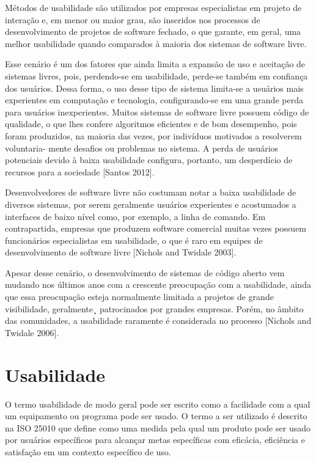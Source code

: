 \documentclass[12pt]{article}
\begin{document}
Métodos de usabilidade são utilizados por empresas especialistas em projeto de interação e, em menor ou maior grau, são inseridos nos processos de desenvolvimento de projetos de software fechado, o que garante, em geral, uma melhor usabilidade quando comparados à maioria dos sistemas de software livre.
%

Esse cenário é um dos fatores que ainda limita a expansão de uso e aceitação de sistemas livres, pois, perdendo-se em usabilidade, perde-se também em confiança dos usuários. Dessa forma, o uso desse tipo de sistema limita-se a usuários mais experientes em computação e tecnologia, configurando-se em uma grande perda para usuários inexperientes. Muitos sistemas de software livre possuem código de qualidade, o que lhes confere algoritmos eficientes e de bom desempenho, pois foram produzidos, na maioria das vezes, por indivíduos motivados a resolverem voluntaria- mente desafios ou problemas no sistema. A perda de usuários potenciais devido à baixa usabilidade configura, portanto, um desperdício de recursos para a sociedade [Santos 2012].
%

Desenvolvedores de software livre não costumam notar a baixa usabilidade de diversos sistemas, por serem geralmente usuários experientes e acostumados a interfaces de baixo nível como, por exemplo, a linha de comando. Em contrapartida, empresas que produzem software comercial muitas vezes possuem funcionários especialistas em usabilidade, o que é raro em equipes de desenvolvimento de software livre [Nichols and Twidale 2003].
%

Apesar desse cenário, o desenvolvimento de sistemas de código aberto vem mudando nos últimos anos com a crescente preocupação com a usabilidade, ainda que essa preocupação esteja normalmente limitada a projetos de grande visibilidade, geralmente¸ patrocinados por grandes empresas. Porém, no âmbito das comunidades, a usabilidade raramente é considerada no processo [Nichols and Twidale 2006].

\section{Usabilidade}
\label{sec:usabilidade}
O termo usabilidade de modo geral pode ser escrito como a facilidade com a qual um equipamento ou programa pode ser usado. O termo a ser utilizado é descrito na ISO 25010 que define como uma medida pela qual um produto pode ser usado por usuários específicos para alcançar metas específicas com eficácia, eficiência e satisfação em um contexto específico de uso.
%
\end{document}
